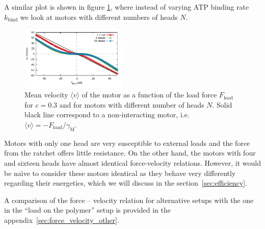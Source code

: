 \documentclass[aps,pre,twocolumn,showpacs,showkeys,superscriptaddress,floatfix]{revtex4-1}
\begin{document}
A similar plot is shown in figure \ref{fig:F_v_heads}, where instead of varying ATP binding rate $k_\text{bind}$ we look at motors with different numbers of heads $N$. 
\begin{figure}[t]
\centering
\includegraphics[width=0.45\textwidth,height=!]{F_v_heads}
\caption{
\label{fig:F_v_heads} 
Mean velocity $\langle v \rangle$ of the motor as a function of the load force $F_\text{load}$ for $c=0.3$ and for motors with different number of heads $N$.
Solid black line correspond to a non-interacting motor, i.e. $\langle v \rangle = - F_\text{load} / \gamma_\text{M}$. 
}
\end{figure}
Motors with only one head are very susceptible to external loads and the force from the ratchet offers little resistance. 
On the other hand, the motors with four and sixteen heads have almost identical force-velocity relations. 
However, it would be na\"{\i}ve to consider these motors identical as they behave very differently regarding their energetics,  
which we will discuss in the section~\ref{sec:efficiency}.

A comparison of the force -- velocity relation for alternative setups with the one in the ``load on the polymer'' setup is provided in the appendix~\ref{sec:force_velocity_other}.
\end{document}

